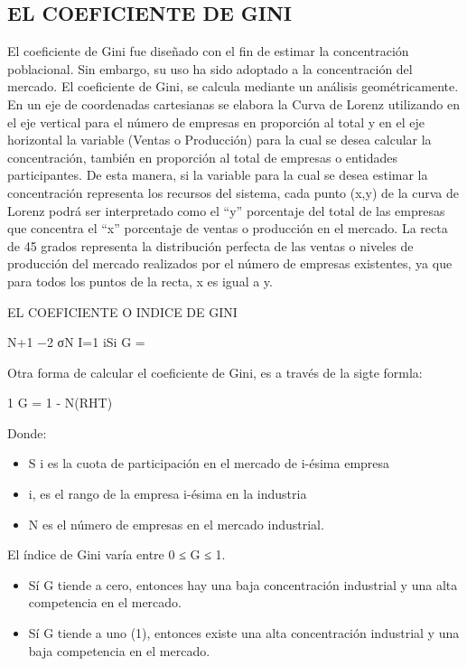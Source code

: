 \documentclass[
  letterpaper,
  DIV=11,
  numbers=noendperiod]{scrartcl}
\begin{document}
\hypertarget{el-coeficiente-de-gini}{%
\subsection{EL COEFICIENTE DE GINI}\label{el-coeficiente-de-gini}}

El coeficiente de Gini fue diseñado con el fin de estimar la
concentración poblacional. Sin embargo, su uso ha sido adoptado a la
concentración del mercado. El coeficiente de Gini, se calcula mediante
un análisis geométricamente. En un eje de coordenadas cartesianas se
elabora la Curva de Lorenz utilizando en el eje vertical para el número
de empresas en proporción al total y en el eje horizontal la variable
(Ventas o Producción) para la cual se desea calcular la concentración,
también en proporción al total de empresas o entidades participantes. De
esta manera, si la variable para la cual se desea estimar la
concentración representa los recursos del sistema, cada punto (x,y) de
la curva de Lorenz podrá ser interpretado como el ``y'' porcentaje del
total de las empresas que concentra el ``x'' porcentaje de ventas o
producción en el mercado. La recta de 45 grados representa la
distribución perfecta de las ventas o niveles de producción del mercado
realizados por el número de empresas existentes, ya que para todos los
puntos de la recta, x es igual a y.

EL COEFICIENTE O INDICE DE GINI

N+1 −2 σN I=1 iSi G =

Otra forma de calcular el coeficiente de Gini, es a través de la sigte
formla:

1 G = 1 - N(RHT)

Donde:

\begin{itemize}
\item
  S i es la cuota de participación en el mercado de i-ésima empresa
\item
  i, es el rango de la empresa i-ésima en la industria
\item
  N es el número de empresas en el mercado industrial.
\end{itemize}

El índice de Gini varía entre 0 ≤ G ≤ 1.

\begin{itemize}
\item
  Sí G tiende a cero, entonces hay una baja concentración industrial y
  una alta competencia en el mercado.
\item
  Sí G tiende a uno (1), entonces existe una alta concentración
  industrial y una baja competencia en el mercado.
\end{itemize}
\end{document}
